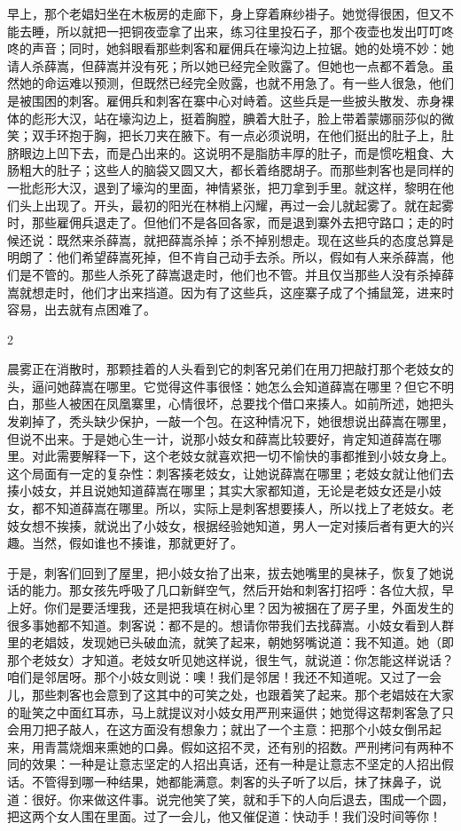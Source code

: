 早上，那个老娼妇坐在木板房的走廊下，身上穿着麻纱褂子。她觉得很困，但又不能去睡，所以就把一把铜夜壶拿了出来，练习往里投石子，那个夜壶也发出叮叮咚咚的声音；同时，她斜眼看那些刺客和雇佣兵在壕沟边上拉锯。她的处境不妙：她请人杀薛嵩，但薛嵩并没有死；所以她已经完全败露了。但她也一点都不着急。虽然她的命运难以预测，但既然已经完全败露，也就不用急了。有一些人很急，他们是被围困的刺客。雇佣兵和刺客在寨中心对峙着。这些兵是一些披头散发、赤身裸体的彪形大汉，站在壕沟边上，挺着胸膛，腆着大肚子，脸上带着蒙娜丽莎似的微笑；双手环抱于胸，把长刀夹在腋下。有一点必须说明，在他们挺出的肚子上，肚脐眼边上凹下去，而是凸出来的。这说明不是脂肪丰厚的肚子，而是惯吃粗食、大肠粗大的肚子；这些人的脑袋又圆又大，都长着络腮胡子。而那些刺客也是同样的一批彪形大汉，退到了壕沟的里面，神情紧张，把刀拿到手里。就这样，黎明在他们头上出现了。开头，最初的阳光在林梢上闪耀，再过一会儿就起雾了。就在起雾时，那些雇佣兵退走了。但他们不是各回各家，而是退到寨外去把守路口；走的时候还说：既然来杀薛嵩，就把薛嵩杀掉；杀不掉别想走。现在这些兵的态度总算是明朗了：他们希望薛嵩死掉，但不肯自己动手去杀。所以，假如有人来杀薛嵩，他们是不管的。那些人杀死了薛嵩退走时，他们也不管。并且仅当那些人没有杀掉薛嵩就想走时，他们才出来挡道。因为有了这些兵，这座寨子成了个捕鼠笼，进来时容易，出去就有点困难了。 

2 

晨雾正在消散时，那颗挂着的人头看到它的刺客兄弟们在用刀把敲打那个老妓女的头，逼问她薛嵩在哪里。它觉得这件事很怪：她怎么会知道薛嵩在哪里？但它不明白，那些人被困在凤凰寨里，心情很坏，总要找个借口来揍人。如前所述，她把头发剃掉了，秃头缺少保护，一敲一个包。在这种情况下，她很想说出薛嵩在哪里，但说不出来。于是她心生一计，说那小妓女和薛嵩比较要好，肯定知道薛嵩在哪里。对此需要解释一下，这个老妓女就喜欢把一切不愉快的事都推到小妓女身上。这个局面有一定的复杂性：刺客揍老妓女，让她说薛嵩在哪里；老妓女就让他们去揍小妓女，并且说她知道薛嵩在哪里；其实大家都知道，无论是老妓女还是小妓女，都不知道薛嵩在哪里。所以，实际上是刺客想要揍人，所以找上了老妓女。老妓女想不挨揍，就说出了小妓女，根据经验她知道，男人一定对揍后者有更大的兴趣。当然，假如谁也不揍谁，那就更好了。 

于是，刺客们回到了屋里，把小妓女抬了出来，拔去她嘴里的臭袜子，恢复了她说话的能力。那女孩先呼吸了几口新鲜空气，然后开始和刺客打招呼：各位大叔，早上好。你们是要活埋我，还是把我填在树心里？因为被捆在了房子里，外面发生的很多事她都不知道。刺客说：都不是的。想请你带我们去找薛嵩。小妓女看到人群里的老娼妓，发现她已头破血流，就笑了起来，朝她努嘴说道：我不知道。她（即那个老妓女）才知道。老妓女听见她这样说，很生气，就说道：你怎能这样说话？咱们是邻居呀。那个小妓女则说：噢！我们是邻居！我还不知道呢。又过了一会儿，那些刺客也会意到了这其中的可笑之处，也跟着笑了起来。那个老娼妓在大家的耻笑之中面红耳赤，马上就提议对小妓女用严刑来逼供；她觉得这帮刺客急了只会用刀把子敲人，在这方面没有想象力；就出了一个主意：把那个小妓女倒吊起来，用青蒿烧烟来熏她的口鼻。假如这招不灵，还有别的招数。严刑拷问有两种不同的效果：一种是让意志坚定的人招出真话，还有一种是让意志不坚定的人招出假话。不管得到哪一种结果，她都能满意。刺客的头子听了以后，抹了抹鼻子，说道：很好。你来做这件事。说完他笑了笑，就和手下的人向后退去，围成一个圆，把这两个女人围在里面。过了一会儿，他又催促道：快动手！我们没时间等你！ 

